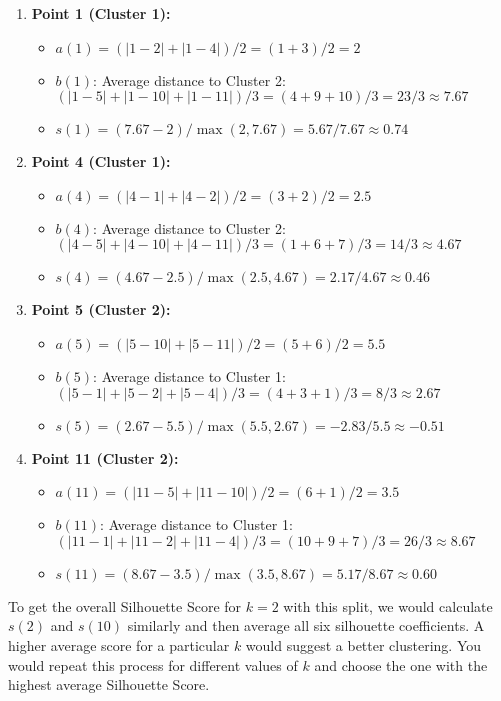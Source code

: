\documentclass{article}
\begin{document}
\begin{enumerate}
    \item \textbf{Point 1 (Cluster 1):}
    \begin{itemize}
        \item $a(1) = (|1-2| + |1-4|) / 2 = (1 + 3) / 2 = 2$
        \item $b(1)$: Average distance to Cluster 2: $(|1-5| + |1-10| + |1-11|) / 3 = (4 + 9 + 10) / 3 = 23/3 \approx 7.67$
        \item $s(1) = (7.67 - 2) / \max(2, 7.67) = 5.67 / 7.67 \approx 0.74$
    \end{itemize}
    \item \textbf{Point 4 (Cluster 1):}
    \begin{itemize}
        \item $a(4) = (|4-1| + |4-2|) / 2 = (3 + 2) / 2 = 2.5$
        \item $b(4)$: Average distance to Cluster 2: $(|4-5| + |4-10| + |4-11|) / 3 = (1 + 6 + 7) / 3 = 14/3 \approx 4.67$
        \item $s(4) = (4.67 - 2.5) / \max(2.5, 4.67) = 2.17 / 4.67 \approx 0.46$
    \end{itemize}
    \item \textbf{Point 5 (Cluster 2):}
    \begin{itemize}
        \item $a(5) = (|5-10| + |5-11|) / 2 = (5 + 6) / 2 = 5.5$
        \item $b(5)$: Average distance to Cluster 1: $(|5-1| + |5-2| + |5-4|) / 3 = (4 + 3 + 1) / 3 = 8/3 \approx 2.67$
        \item $s(5) = (2.67 - 5.5) / \max(5.5, 2.67) = -2.83 / 5.5 \approx -0.51$
    \end{itemize}
    \item \textbf{Point 11 (Cluster 2):}
    \begin{itemize}
        \item $a(11) = (|11-5| + |11-10|) / 2 = (6 + 1) / 2 = 3.5$
        \item $b(11)$: Average distance to Cluster 1: $(|11-1| + |11-2| + |11-4|) / 3 = (10 + 9 + 7) / 3 = 26/3 \approx 8.67$
        \item $s(11) = (8.67 - 3.5) / \max(3.5, 8.67) = 5.17 / 8.67 \approx 0.60$
    \end{itemize}
\end{enumerate}

To get the overall Silhouette Score for $k=2$ with this split, we would calculate $s(2)$ and $s(10)$ similarly and then average all six silhouette coefficients. A higher average score for a particular $k$ would suggest a better clustering. You would repeat this process for different values of $k$ and choose the one with the highest average Silhouette Score.
\end{document}
